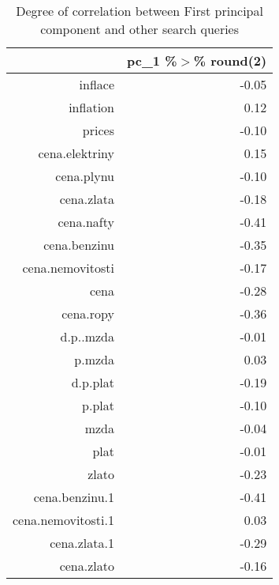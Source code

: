 \begin{table}[ht]
\centering
\begin{tabular}{rr}
  \hline
 & pc\_1 \%$>$\% round(2) \\ 
  \hline
inflace & -0.05 \\ 
  inflation & 0.12 \\ 
  prices & -0.10 \\ 
  cena.elektriny & 0.15 \\ 
  cena.plynu & -0.10 \\ 
  cena.zlata & -0.18 \\ 
  cena.nafty & -0.41 \\ 
  cena.benzinu & -0.35 \\ 
  cena.nemovitosti & -0.17 \\ 
  cena & -0.28 \\ 
  cena.ropy & -0.36 \\ 
  d.p..mzda & -0.01 \\ 
  p.mzda & 0.03 \\ 
  d.p.plat & -0.19 \\ 
  p.plat & -0.10 \\ 
  mzda & -0.04 \\ 
  plat & -0.01 \\ 
  zlato & -0.23 \\ 
  cena.benzinu.1 & -0.41 \\ 
  cena.nemovitosti.1 & 0.03 \\ 
  cena.zlata.1 & -0.29 \\ 
  cena.zlato & -0.16 \\ 
   \hline
\end{tabular}
\caption{Degree of correlation between First principal component and other search queries} 
\end{table}
